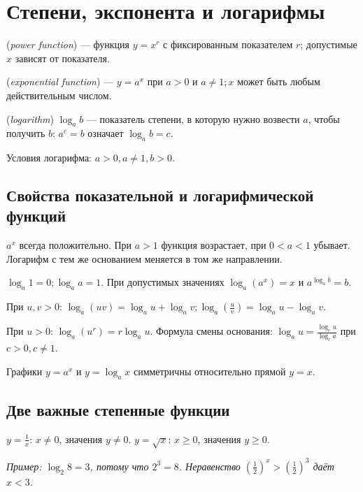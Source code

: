 \chapter{Степени, экспонента и логарифмы}\label{chap:c14-exponential}
\begin{definition} (\emph{power function}) — функция \(y = x^{r}\) с фиксированным показателем \(r\); допустимые \(x\) зависят от показателя.\end{definition}
\begin{definition} (\emph{exponential function}) — \(y = a^{x}\) при \(a > 0\) и \(a \ne  1;\allowbreak x\) может быть любым действительным числом.\end{definition}
\begin{definition} (\emph{logarithm}) \(\log _{a} b\) — показатель степени, в которую нужно возвести \(a\), чтобы получить \(b\): \(a^{c} = b\) означает \(\log _{a} b = c\).\end{definition}
Условия логарифма: \(a > 0,\allowbreak a \ne  1,\allowbreak b > 0\).\par
\section{Свойства показательной и логарифмической функций}
\(a^{x}\) всегда положительно. При \(a > 1\) функция возрастает, при \(0 < a < 1\) убывает. Логарифм с тем же основанием меняется в том же направлении.\par
\(\log _{a} 1 = 0;\allowbreak \log _{a} a = 1\). При допустимых значениях \(\log _{a} (a^{x}) = x\) и \(a^{\log _{a} b} = b\).\par
При \(u,\allowbreak v > 0\): \(\log _{a} (uv) = \log _{a} u + \log _{a} v;\allowbreak \log _{a} (\frac{u}{v}) = \log _{a} u - \log _{a} v\).\par
При \(u > 0\): \(\log _{a} (u^{r}) = r \log _{a} u\). Формула смены основания: \(\log _{a} u = \frac{\log _{c} u}{\log _{c} a}\) при \(c > 0,\allowbreak c \ne  1\).\par
Графики \(y = a^{x}\) и \(y = \log _{a} x\) симметричны относительно прямой \(y = x\).\par
\section{Две важные степенные функции}
\(y = \frac{1}{x}\): \(x \ne 0\), значения \(y \ne  0\). \(y = \sqrt{x}\): \(x \ge 0\), значения \(y \ge  0\).\par
{\small\textit{Пример: \(\log _{2} 8 = 3\), потому что \(2^{3} = 8\). Неравенство \((\frac{1}{2})^{x} > (\frac{1}{2})^{3}\) даёт \(x < 3\).}}\par


